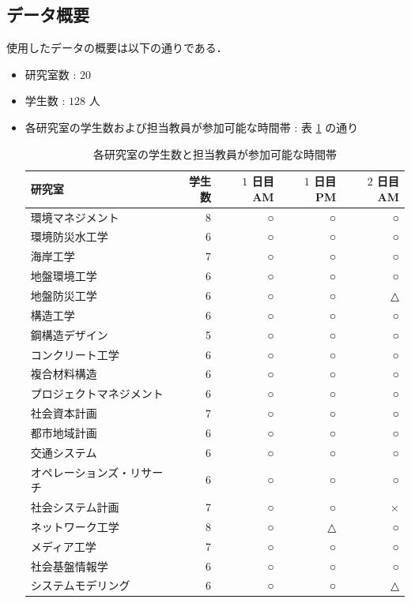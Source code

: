 \documentclass[a4paper,12pt,fleqn]{jarticle}
\begin{document}
\subsection{データ概要}\label{sec:data}
使用したデータの概要は以下の通りである．
\begin{itemize}
\item 研究室数 : $20$
\item 学生数 : $128$ 人
\item 各研究室の学生数および担当教員が参加可能な時間帯 : 表 \ref{tb:LabData2017} の通り
 \begin{table}[H]
    \begin{center}
      \caption{各研究室の学生数と担当教員が参加可能な時間帯}
      \label{tb:LabData2017}
      \begin{tabular}{lrrrr} \toprule
        研究室 & 学生数 & $1$ 日目AM & $1$ 日目PM & $2$ 日目AM\\ \toprule
        環境マネジメント & 8 & ○ & ○ & ○\\ \hline
        環境防災水工学 & 6 & ○ & ○ & ○\\ \hline
        海岸工学 & 7 & ○ & ○ & ○\\ \hline
        地盤環境工学 & 6 & ○ & ○ & ○\\ \hline
        地盤防災工学 & 6 & ○ & ○ & △\\ \hline
        構造工学 & 6 & ○ & ○ & ○\\ \hline
        鋼構造デザイン & 5 & ○ & ○ & ○\\ \hline
        コンクリート工学 & 6 & ○ & ○ & ○\\ \hline
        複合材料構造 & 6 & ○ & ○ & ○\\ \hline
        プロジェクトマネジメント & 6 & ○ & ○ & ○\\ \hline
        社会資本計画 & 7 & ○ & ○ & ○\\ \hline
        都市地域計画 & 6 & ○ & ○ & ○\\ \hline
        交通システム & 6 & ○ & ○ & ○\\ \hline
        オペレーションズ・リサーチ & 6 & ○ & ○ & ○\\ \hline
        社会システム計画 & 7 & ○ & ○ & $\times$\\ \hline
        ネットワーク工学 & 8 & ○ & △ & ○\\ \hline
        メディア工学 & 7 & ○ & ○ & ○\\ \hline
        社会基盤情報学 & 6 & ○ & ○ & ○\\ \hline
        システムモデリング & 6 & ○ & ○ & △\\ \hline

\end{tabular}
\end{center}
\end{table}
\end{itemize}
\end{document}

